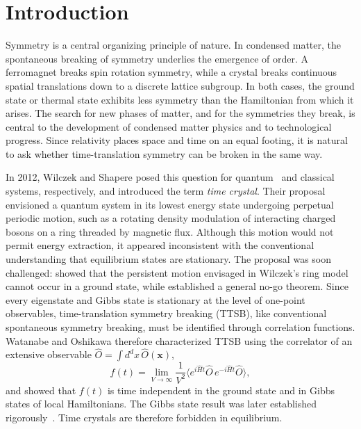 \documentclass[%
reprint,
superscriptaddress,
amsmath,amssymb,
aps,
prb,
showkeys,%
floatfix,
]{revtex4-2}
\let\cite\citep   %
\begin{document}
	\section{\label{sec:intro}Introduction}
	
	Symmetry is a central organizing principle of nature. In condensed matter, the spontaneous breaking of symmetry underlies the emergence of order. A ferromagnet breaks spin rotation symmetry, while a crystal breaks continuous spatial translations down to a discrete lattice subgroup. In both cases, the ground state or thermal state exhibits less symmetry than the Hamiltonian from which it arises. The search for new phases of matter, and for the symmetries they break, is central to the development of condensed matter physics and to technological progress. Since relativity places space and time on an equal footing, it is natural to ask whether time-translation symmetry can be broken in the same way.
	
	In 2012, Wilczek and Shapere posed this question for quantum~\cite{Wilczek2012} and classical~\cite{ShapereWilczek2012} systems, respectively, and introduced the term \emph{time crystal}. Their proposal envisioned a quantum system in its lowest energy state undergoing perpetual periodic motion, such as a rotating density modulation of interacting charged bosons on a ring threaded by magnetic flux. Although this motion would not permit energy extraction, it appeared inconsistent with the conventional understanding that equilibrium states are stationary. The proposal was soon challenged: \citet{Bruno2013} showed that the persistent motion envisaged in Wilczek's ring model cannot occur in a ground state, while \citet{WatanabeOshikawa2015} established a general no-go theorem. Since every eigenstate and Gibbs state is stationary at the level of one-point observables, time-translation symmetry breaking (TTSB), like conventional spontaneous symmetry breaking, must be identified through correlation functions. Watanabe and Oshikawa therefore characterized TTSB using the correlator of an extensive observable $\hat{O}=\int d^dx\,\hat{O}(\mathbf{x})$,
	\begin{equation}
		f(t)=\lim_{V\to\infty}\frac{1}{V^{2}}\big\langle e^{i\hat{H}t}\hat{O}\, e^{-i\hat{H}t}\hat{O}\big\rangle,
		\label{eq:WO}
	\end{equation}
	and showed that $f(t)$ is time independent in the ground state and in Gibbs states of local Hamiltonians. The Gibbs state result was later established rigorously~\cite{WatanabeOshikawaKoma2020}. Time crystals are therefore forbidden in equilibrium.
	
\end{document}
